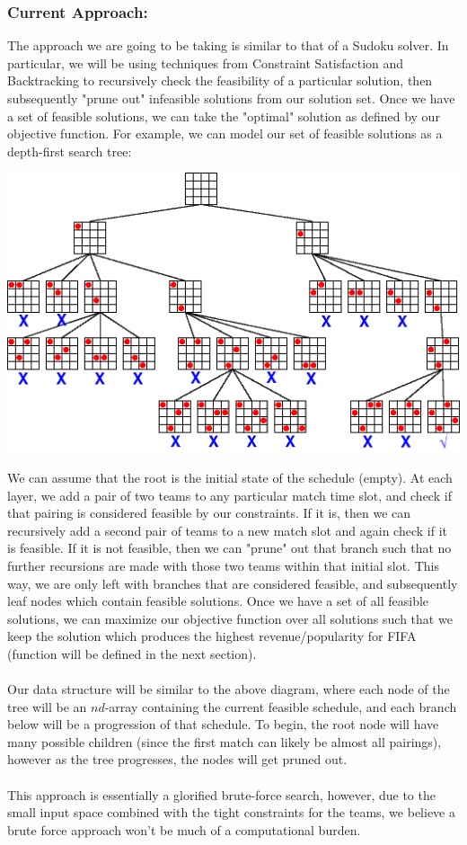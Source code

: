\documentclass[letterpaper,10pt]{article}
\begin{document}
\newpage
\subsubsection*{Current Approach:} 
The approach we are going to be taking is similar to that of a Sudoku solver. In particular, we will be using techniques from Constraint Satisfaction and Backtracking to recursively check the feasibility of a particular solution, then subsequently "prune out" infeasible solutions from our solution set. Once we have a set of feasible solutions, we can take the "optimal" solution as defined by our objective function. For example, we can model our set of feasible solutions as a depth-first search tree:
\begin{center}
\includegraphics[scale=0.8]{backtrack.png}
\end{center}
We can assume that the root is the initial state of the schedule (empty). At each layer, we add a pair of two teams to any particular match time slot, and check if that pairing is considered feasible by our constraints. If it is, then we can recursively add a second pair of teams to a new match slot and again check if it is feasible. If it is not feasible, then we can "prune" out that branch such that no further recursions are made with those two teams within that initial slot. This way, we are only left with branches that are considered feasible, and subsequently leaf nodes which contain feasible solutions. Once we have a set of all feasible solutions, we can maximize our objective function over all solutions such that we keep the solution which produces the highest revenue/popularity for FIFA (function will be defined in the next section). \\
\\
Our data structure will be similar to the above diagram, where each node of the tree will be an $nd$-array containing the current feasible schedule, and each branch below will be a progression of that schedule. To begin, the root node will have many possible children (since the first match can likely be almost all pairings), however as the tree progresses, the nodes will get pruned out.\\
\\
This approach is essentially a glorified brute-force search, however, due to the small input space combined with the tight constraints for the teams, we believe a brute force approach won't be much of a computational burden.
\end{document}
